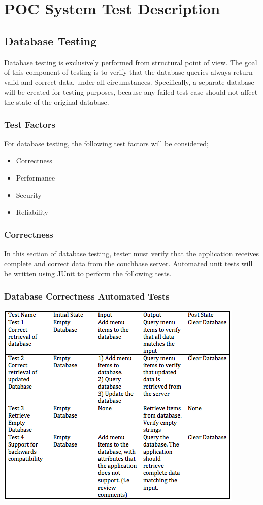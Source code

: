 \documentclass[12pt]{article}
\begin{document}
\section{POC System Test Description}

\subsection{Database Testing}
Database testing is exclusively performed from structural point of view. The goal of this component of testing is to verify that the database queries always return valid and correct data, under all circumstances. Specifically, a separate database will be created for testing purposes, because any failed test case should not affect the state of the original database. 
\subsubsection{Test Factors}
For database testing, the following test factors will be considered;
\begin{itemize}
 \item Correctness
 \item Performance
 \item Security
 \item Reliability
 \end{itemize}
 
\subsubsection{Correctness}
In this section of database testing, tester must verify that the application receives complete and correct data from the couchbase server. Automated unit tests will be written using JUnit to perform the following tests.
\subsubsection{Database Correctness Automated Tests }
\includegraphics[width=\textwidth,height=\textheight,keepaspectratio]{correctness_tests.png}
\end{document}
